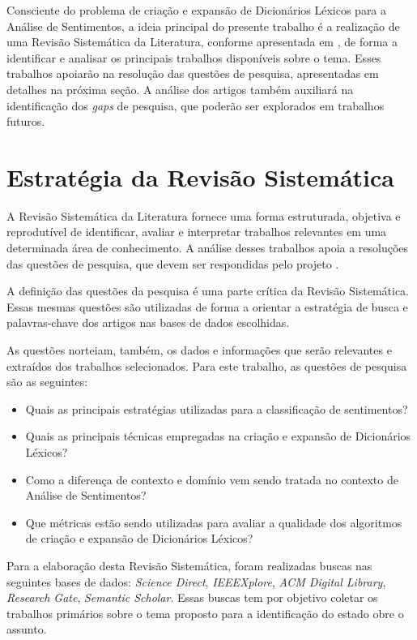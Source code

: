 \documentclass[12pt]{article}
\begin{document}
Consciente do problema de criação e expansão de Dicionários Léxicos para a Análise de Sentimentos, a ideia principal do presente trabalho é a realização de uma Revisão Sistemática da Literatura, conforme apresentada em \cite{Kitchenham2004}, de forma a identificar e analisar os principais trabalhos disponíveis sobre o tema. Esses trabalhos apoiarão na resolução das questões de pesquisa, apresentadas em detalhes na próxima seção. A análise dos artigos também auxiliará na identificação dos \emph{gaps} de pesquisa, que poderão ser explorados em trabalhos futuros.

\section{Estratégia da Revisão Sistemática}
A Revisão Sistemática da Literatura fornece uma forma estruturada, objetiva e reprodutível de identificar, avaliar e interpretar trabalhos relevantes em uma determinada área de conhecimento. A análise desses trabalhos apoia a resoluções das questões de pesquisa, que devem ser respondidas pelo projeto \cite{Kitchenham2004}.

A definição das questões da pesquisa é uma parte crítica da Revisão Sistemática. Essas mesmas questões são utilizadas de forma a orientar a estratégia de busca e palavras-chave dos artigos nas bases de dados escolhidas.

As questões norteiam, também, os dados e informações que serão relevantes e extraídos dos trabalhos selecionados. Para este trabalho, as questões de pesquisa são as seguintes:

\label{sec:questoesPesquisa}
\begin{itemize}
	\item{Quais as principais estratégias utilizadas para a classificação de sentimentos?}
	\item{Quais as principais técnicas empregadas na criação e expansão de Dicionários Léxicos?}
	\item{Como a diferença de contexto e domínio vem sendo tratada no contexto de Análise de Sentimentos?}
	\item{Que métricas estão sendo utilizadas para avaliar a qualidade dos algoritmos de criação e expansão de Dicionários Léxicos?}
\end{itemize}

Para a elaboração desta Revisão Sistemática, foram realizadas buscas nas seguintes bases de dados: \emph{Science Direct}, \emph{IEEEXplore}, \emph{ACM Digital Library}, \emph{Research Gate}, \emph{Semantic Scholar}. Essas buscas tem por objetivo coletar os trabalhos primários sobre o tema proposto para a identificação do estado obre o assunto. 
\end{document}
